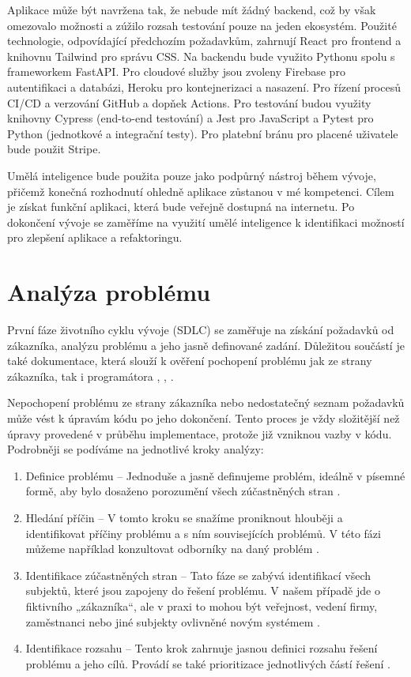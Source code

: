 \documentclass[FM,DP]{tulthesis}
\begin{document}
		Aplikace může být navržena tak, že nebude mít žádný backend, což by však omezovalo možnosti a zúžilo rozsah testování pouze na jeden ekosystém. Použité technologie, odpovídající předchozím požadavkům, zahrnují React pro frontend a knihovnu Tailwind pro správu CSS. Na backendu bude využito Pythonu spolu s frameworkem FastAPI. Pro cloudové služby jsou zvoleny Firebase pro autentifikaci a databázi, Heroku pro kontejnerizaci a nasazení. Pro řízení procesů CI/CD a verzování GitHub a dopňek Actions. Pro testování budou využity knihovny Cypress (end-to-end testování) a Jest pro JavaScript a Pytest pro Python (jednotkové a integrační testy). Pro platební bránu pro placené uživatele bude použit Stripe.
		
		Umělá inteligence bude použita pouze jako podpůrný nástroj během vývoje, přičemž konečná rozhodnutí ohledně aplikace zůstanou v mé kompetenci. Cílem je získat funkční aplikaci, která bude veřejně dostupná na internetu. Po dokončení vývoje se zaměříme na využití umělé inteligence k identifikaci možností pro zlepšení aplikace a refaktoringu.
		
		\section{Analýza problému}
		První fáze životního cyklu vývoje (SDLC) se zaměřuje na získání požadavků od zákazníka, analýzu problému a jeho jasně definované zadání. Důležitou součástí je také dokumentace, která slouží k ověření pochopení problému jak ze strany zákazníka, tak i programátora \cite{problem_analysis3}, \cite{software_analysis}, \cite{SWEBook}.
		
		Nepochopení problému ze strany zákazníka nebo nedostatečný seznam požadavků může vést k úpravám kódu po jeho dokončení. Tento proces je vždy složitější než úpravy provedené v průběhu implementace, protože již vzniknou vazby v kódu. Podrobněji se podíváme na jednotlivé kroky analýzy:
		
		\begin{enumerate}
			\item Definice problému – Jednoduše a jasně definujeme problém, ideálně v písemné formě, aby bylo dosaženo porozumění všech zúčastněných stran \cite{problem_analysis3}.
			\item Hledání příčin – V tomto kroku se snažíme proniknout hlouběji a identifikovat příčiny problému a s ním souvisejících problémů. V této fázi můžeme například konzultovat odborníky na daný problém \cite{problem_analysis3}.
			\item Identifikace zúčastněných stran – Tato fáze se zabývá identifikací všech subjektů, které jsou zapojeny do řešení problému. V našem případě jde o fiktivního „zákazníka“, ale v praxi to mohou být veřejnost, vedení firmy, zaměstnanci nebo jiné subjekty ovlivněné novým systémem \cite{problem_analysis3}.
			\item Identifikace rozsahu – Tento krok zahrnuje jasnou definici rozsahu řešení problému a jeho cílů. Provádí se také prioritizace jednotlivých částí řešení \cite{problem_analysis3}. 
		\end{enumerate}
		
\end{document}
